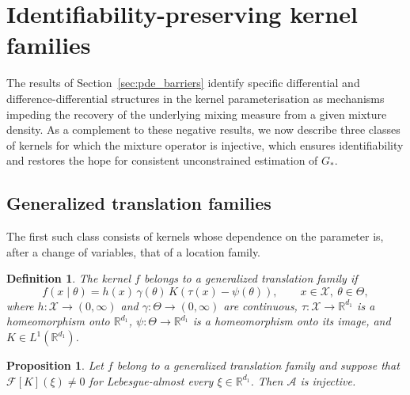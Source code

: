 \documentclass[11pt,twoside]{article} %
\newtheorem{proposition}{Proposition}
\newtheorem{definition}{Definition}
\begin{document}
\section{Identifiability-preserving kernel families}\label{sec:identifiable}

The results of Section~\ref{sec:pde_barriers} identify specific differential and difference-differential structures in the kernel parameterisation as mechanisms impeding the recovery of the underlying mixing measure from a given mixture density. As a complement to these negative results, we now describe three classes of kernels for which the mixture operator is injective, which ensures identifiability and restores the hope for consistent unconstrained estimation of $G_*$. %

\subsection{Generalized translation families}\label{sec:translation}

The first such class consists of kernels whose dependence on the parameter is, after a change of variables, that of a location family.

\begin{definition}\label{def:translation}
The kernel $f$ belongs to a \emph{generalized translation family} if
%
\begin{equation}\label{eq:translation}
    f(x\mid\theta)=h(x)\,\gamma(\theta)\,K(\tau(x)-\psi(\theta)),\qquad x\in\mathcal X,\ \theta\in\Theta,
\end{equation}
%
where $h:\mathcal X\to(0,\infty)$ and $\gamma:\Theta\to(0,\infty)$ are continuous, $\tau:\mathcal X\to\mathbb R^{d_1}$ is a homeomorphism onto $\mathbb R^{d_1}$, $\psi:\Theta\to\mathbb R^{d_1}$ is a homeomorphism onto its image, and $K\in L^1(\mathbb R^{d_1})$.
\end{definition}

\begin{proposition}\label{prop:translation}
Let $f$ belong to a generalized translation family and suppose that $\mathcal F[K](\xi)\ne0$ for Lebesgue-almost every $\xi\in\mathbb R^{d_1}$. Then $\mathcal A$ is injective.
\end{proposition}
\end{document}
